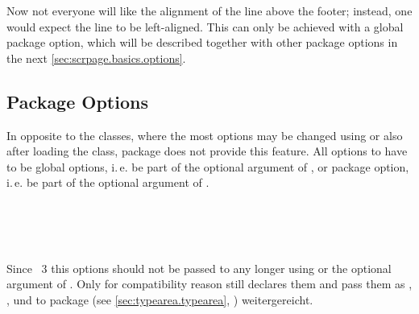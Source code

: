 %
Now not everyone will like the alignment of the line above the footer;
instead, one would expect the line to be left-aligned. This can only
be achieved with a global package option, which will be described
together with other package options in the next
\autoref{sec:scrpage.basics.options}.%
%


\subsection{Package Options}

In opposite to the \KOMAScript{} classes, where the most options may be
changed using  or  also after loading the
class, package  does not provide this feature. All options to  have to be global options,
i.\,e. be part of the optional argument of , or
package option, i.\,e. be part of the optional argument of .

\begin{Declaration}
\\
\\
\\
\end{Declaration}%
%
%
Since \KOMAScript~3
this options should not be passed to  any longer using
 or the optional argument of
. Only for compatibility reason  still
declares them and pass them as ,
,  und
 to package  (see
\autoref{sec:typearea.typearea},
) weitergereicht.
%


